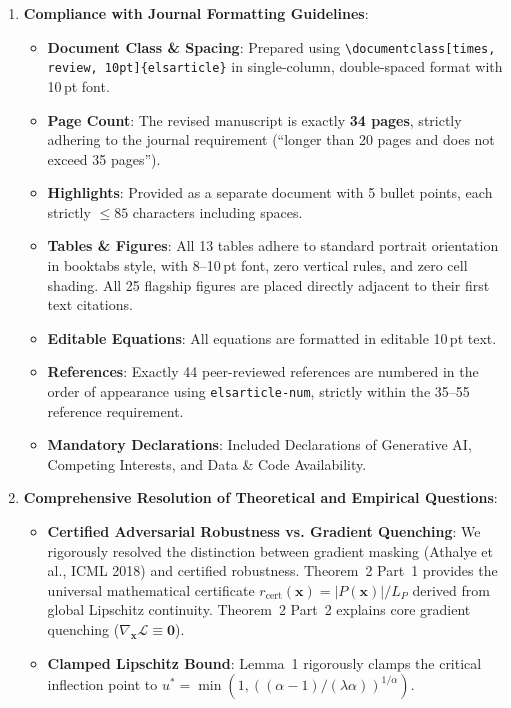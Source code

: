 \documentclass[11pt]{article}
\begin{document}
\begin{enumerate}
    \item \textbf{Compliance with Journal Formatting Guidelines}:
    \begin{itemize}
        \item \textbf{Document Class \& Spacing}: Prepared using \verb|\documentclass[times, review, 10pt]{elsarticle}| in single-column, double-spaced format with 10\,pt font.
        \item \textbf{Page Count}: The revised manuscript is exactly \textbf{34 pages}, strictly adhering to the journal requirement (``longer than 20 pages and does not exceed 35 pages'').
        \item \textbf{Highlights}: Provided as a separate document with 5 bullet points, each strictly $\le 85$ characters including spaces.
        \item \textbf{Tables \& Figures}: All 13 tables adhere to standard portrait orientation in booktabs style, with 8--10\,pt font, zero vertical rules, and zero cell shading. All 25 flagship figures are placed directly adjacent to their first text citations.
        \item \textbf{Editable Equations}: All equations are formatted in editable 10\,pt text.
        \item \textbf{References}: Exactly 44 peer-reviewed references are numbered in the order of appearance using \verb|elsarticle-num|, strictly within the 35--55 reference requirement.
        \item \textbf{Mandatory Declarations}: Included Declarations of Generative AI, Competing Interests, and Data \& Code Availability.
    \end{itemize}
    \item \textbf{Comprehensive Resolution of Theoretical and Empirical Questions}:
    \begin{itemize}
        \item \textbf{Certified Adversarial Robustness vs. Gradient Quenching}: We rigorously resolved the distinction between gradient masking (Athalye et al., ICML 2018) and certified robustness. Theorem~2 Part~1 provides the universal mathematical certificate $r_{\mathrm{cert}}(\mathbf{x}) = |P(\mathbf{x})| / L_P$ derived from global Lipschitz continuity. Theorem~2 Part~2 explains core gradient quenching ($\nabla_{\mathbf{x}} \mathcal{L} \equiv \mathbf{0}$).
        \item \textbf{Clamped Lipschitz Bound}: Lemma~1 rigorously clamps the critical inflection point to $u^* = \min(1, ((\alpha - 1)/(\lambda \alpha))^{1/\alpha})$.

\end{itemize}
\end{enumerate}
\end{document}
